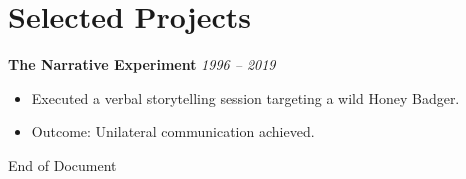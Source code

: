 \documentclass[10pt, a4paper]{article}
\begin{document}
\section{Selected Projects}
\textbf{The Narrative Experiment} \hfill \textit{1996 -- 2019}
\begin{itemize}
    \item Executed a verbal storytelling session targeting a wild Honey Badger.
    \item Outcome: Unilateral communication achieved.
\end{itemize}

\vspace{1cm}
\centerline{\scriptsize \color{LIGHTLINE} \textendash \quad End of Document \quad \textendash}
\end{document}
